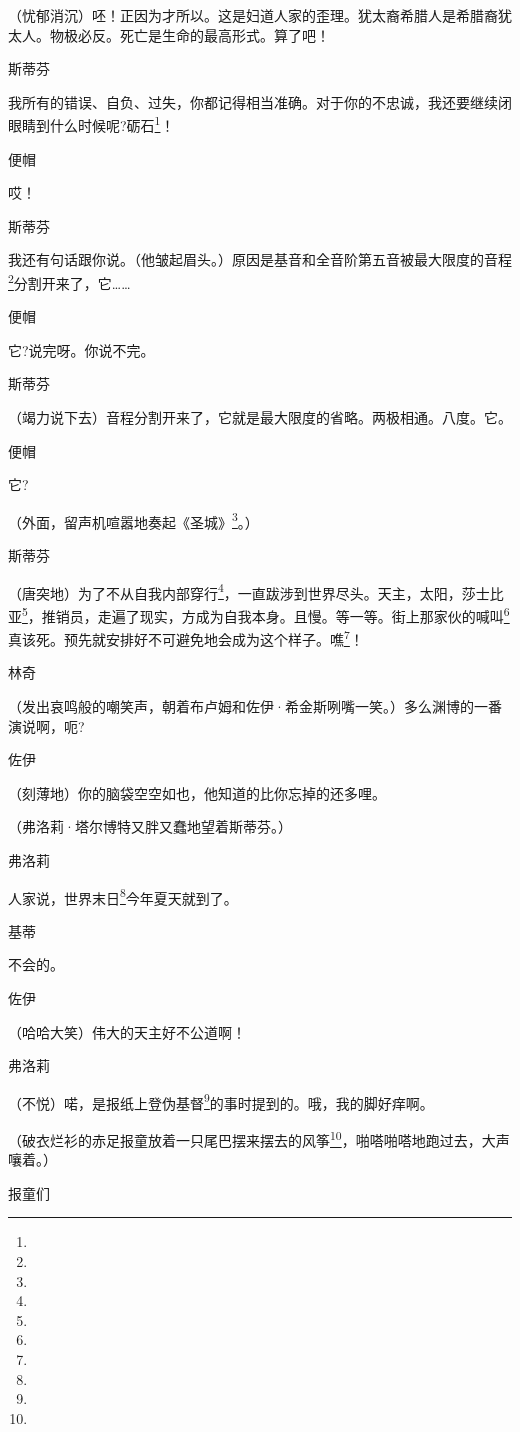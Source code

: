 \par （忧郁消沉）呸！正因为才所以。这是妇道人家的歪理。犹太裔希腊人是希腊裔犹太人。物极必反。死亡是生命的最高形式。算了吧！
\par 斯蒂芬
\par 我所有的错误、自负、过失，你都记得相当准确。对于你的不忠诚，我还要继续闭眼睛到什么时候呢?砺石\footnote{}！
\par 便帽
\par 哎！
\par 斯蒂芬
\par 我还有句话跟你说。（他皱起眉头。）原因是基音和全音阶第五音被最大限度的音程\footnote{}分割开来了，它……
\par 便帽
\par 它?说完呀。你说不完。
\par 斯蒂芬
\par （竭力说下去）音程分割开来了，它就是最大限度的省略。两极相通。八度。它。
\par 便帽
\par 它?
\par （外面，留声机喧嚣地奏起《圣城》\footnote{}。）
\par 斯蒂芬
\par （唐突地）为了不从自我内部穿行\footnote{}，一直跋涉到世界尽头。天主，太阳，莎士比亚\footnote{}，推销员，走遍了现实，方成为自我本身。且慢。等一等。街上那家伙的喊叫\footnote{}真该死。预先就安排好不可避免地会成为这个样子。噍\footnote{}！
\par 林奇
\par （发出哀鸣般的嘲笑声，朝着布卢姆和佐伊·希金斯咧嘴一笑。）多么渊博的一番演说啊，呃?
\par 佐伊
\par （刻薄地）你的脑袋空空如也，他知道的比你忘掉的还多哩。
\par （弗洛莉·塔尔博特又胖又蠢地望着斯蒂芬。）
\par 弗洛莉
\par 人家说，世界末日\footnote{}今年夏天就到了。
\par 基蒂
\par 不会的。
\par 佐伊
\par （哈哈大笑）伟大的天主好不公道啊！
\par 弗洛莉
\par （不悦）喏，是报纸上登伪基督\footnote{}的事时提到的。哦，我的脚好痒啊。
\par （破衣烂衫的赤足报童放着一只尾巴摆来摆去的风筝\footnote{}，啪嗒啪嗒地跑过去，大声嚷着。）
\par 报童们

